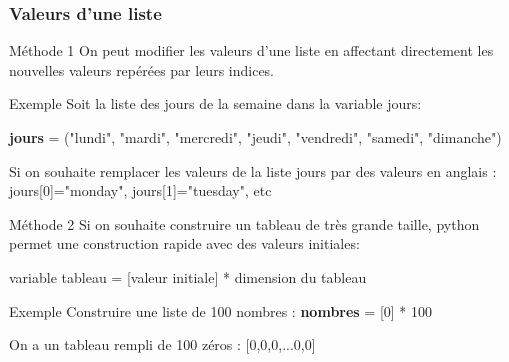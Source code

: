 \documentclass[9pt]{beamer}
\begin{document}
\begin{frame}
\frametitle{Valeurs d'une liste}

\begin{block}{Méthode 1}
On peut modifier les valeurs d'une liste en affectant directement les nouvelles valeurs repérées par leurs indices.
\end{block}

\begin{exampleblock}{Exemple}
Soit la liste des jours de la semaine dans la variable jours:

\hspace{0.5cm}\textbf{jours} = ("lundi", "mardi", "mercredi", "jeudi", "vendredi", "samedi", "dimanche")

Si on souhaite remplacer les valeurs de la liste jours par des valeurs en anglais :\\
jours[0]="monday", jours[1]="tuesday", etc
\end{exampleblock}

\begin{block}{Méthode 2}
Si on souhaite construire un tableau de très grande taille, python permet une construction rapide avec des valeurs initiales:

\hspace{0.5cm} variable tableau = [valeur initiale] * dimension du tableau
\end{block}

\begin{exampleblock}{Exemple}
Construire une liste de 100 nombres : \hspace{0.25cm}\textbf{nombres} = [0] * 100

On a un tableau rempli de 100 zéros : [0,0,0,...0,0]
\end{exampleblock}
\end{frame}
\end{document}
